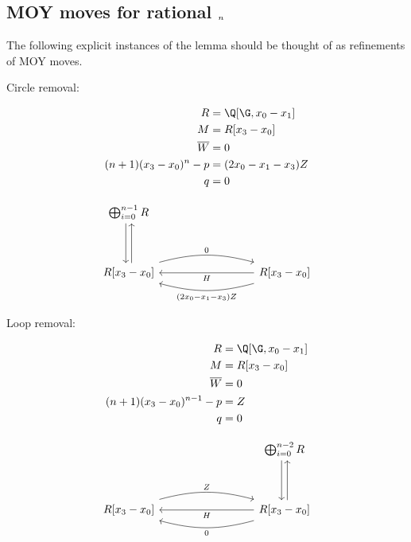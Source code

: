 
\subsection{MOY moves for rational $\sl_n$}
The following explicit instances of the lemma should be thought of as refinements of MOY moves.

Circle removal:\\

    \begin{minipage}[c]{0.5\textwidth}
        \begin{align*}
            R &= \Q[\G, x_0-x_1] \\
            M &= R[x_3-x_0] \\
            \overline{W} &= 0 \\
            (n+1)(x_3-x_0)^n-p &= (2x_0-x_1-x_3)Z \\
            q &= 0
        \end{align*}
    \end{minipage}
    \hfill
    \begin{minipage}[c]{0.45\textwidth}
        \[\begin{tikzcd}[column sep=3cm]
            \bigoplus_{i=0}^{n-1}R\ar[dd, shift right=0.6ex, swap]\ar[dd, leftarrow, shift left=0.6ex]&\\\\
            R[x_3-x_0]\arrow[r, "0", shift left=0.5ex, bend left=15]& R[x_3-x_0]\ar[l, "H"]\ar[l, "(2x_0-x_1-x_3)Z", shift left=0.5ex, bend left=15]
        \end{tikzcd}\]
    \end{minipage}

    \vspace{1cm} %
Loop removal:\\

    \begin{minipage}[c]{0.5\textwidth}
        \begin{align*}
            R&= \Q[\G, x_0-x_1] \\
            M &= R[x_3-x_0]\\
            \overline{W} &= 0 \\
            (n+1)(x_3-x_0)^{n-1}-p &= Z \\
            q &= 0
        \end{align*}
    \end{minipage}
    \hfill
    \begin{minipage}[c]{0.45\textwidth}
        \[\begin{tikzcd}[column sep=3cm]
            &\bigoplus_{i=0}^{n-2}R\ar[dd, shift right=0.6ex, swap]\ar[dd, leftarrow, shift left=0.6ex]\\\\
            R[x_3-x_0]\arrow[r, "Z", shift left=0.5ex, bend left=15]& R[x_3-x_0]\ar[l, "H"]\ar[l, "0", shift left=0.5ex, bend left=15]
        \end{tikzcd}\]
    \end{minipage}

